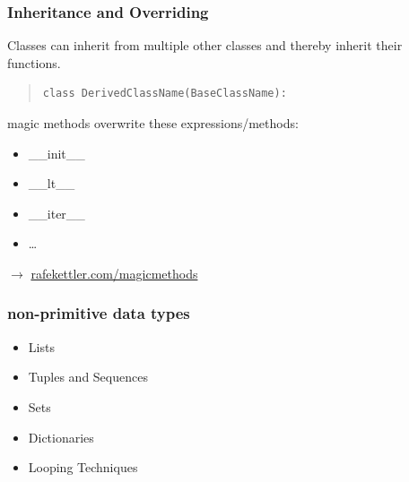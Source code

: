 \documentclass{beamer}
\begin{document}
\begin{frame}[fragile]
\frametitle{Inheritance and Overriding}
Classes can inherit from multiple other classes and thereby inherit their functions.

\begin{quote}
\begin{verbatim}
class DerivedClassName(BaseClassName):
\end{verbatim}\end{quote}
\hbox{}

magic methods overwrite these expressions/methods:
\begin{itemize}
	\item \_\_init\_\_
	\item \_\_lt\_\_
	\item \_\_iter\_\_
	\item \dots
\end{itemize}
$\rightarrow$ \href{http://www.rafekettler.com/magicmethods.html}{rafekettler.com/magicmethods}
\end{frame}

\begin{frame}[fragile]
\frametitle{non-primitive data types}
\begin{itemize}
	\item Lists
	\item Tuples and Sequences
	\item Sets
	\item Dictionaries
	\item Looping Techniques
\end{itemize}
\framesubtitle{}

\end{frame}
\end{document}
